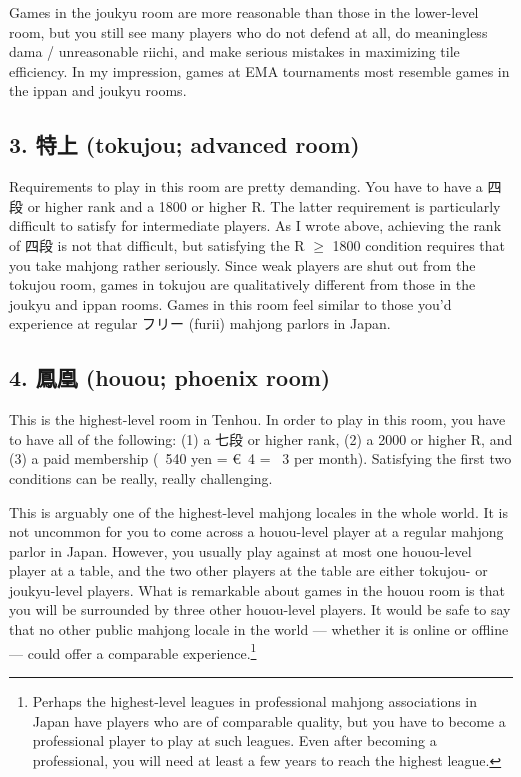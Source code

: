 \bigskip
Games in the {\jap joukyu} room are more reasonable than those in the lower-level room, but you still see many players who do not defend at all, do meaningless {\jap dama} / unreasonable riichi, and make serious mistakes in maximizing tile efficiency. In my impression, games at EMA tournaments most resemble games in the {\jap ippan} and {\jap joukyu} rooms. 

\subsection*{3. 特上 ({\jap tokujou}; advanced room)}
Requirements to play in this room are pretty demanding. You have to have a 四段 or higher rank and a 1800 or higher R. The latter requirement is particularly difficult to satisfy for intermediate players. As I wrote above, achieving the rank of 四段 is not that difficult, but satisfying the R $\geq$ 1800 condition requires that you take mahjong rather seriously. Since weak players are shut out from the {\jap tokujou} room, games in {\jap tokujou} are qualitatively different from those in the {\jap joukyu} and {\jap ippan} rooms. Games in this room feel similar to those you'd experience at regular フリー ({\jap furii}) mahjong parlors in Japan. 

\subsection*{4. 鳳凰 ({\jap houou}; phoenix room)}
This is the highest-level room in {\jap Tenhou}. In order to play in this room, you have to have all of the following: (1) a 七段 or higher rank, (2) a 2000 or higher R, and (3) a paid membership (\textyen~540 yen = \euro~4 = \textsterling~3 per month). Satisfying the first two conditions can be really, really challenging. 

\bigskip
This is arguably one of the highest-level mahjong locales in the whole world. It is not uncommon for you to come across a {\jap houou}-level player at a regular mahjong parlor in Japan. However, you usually play against at most one {\jap houou}-level player at a table, and the two other players at the table are either {\jap tokujou}- or {\jap joukyu}-level players. What is remarkable about games in the {\jap houou} room is that you will be surrounded by three other {\jap houou}-level players. 
It would be safe to say that no other public mahjong locale in the world --- whether it is online or offline --- could offer a comparable experience.\footnote{Perhaps the highest-level leagues in professional mahjong associations in Japan have players who are of comparable quality, but you have to become a professional player to play at such leagues. Even after becoming a professional, you will need at least a few years to reach the highest league.}

